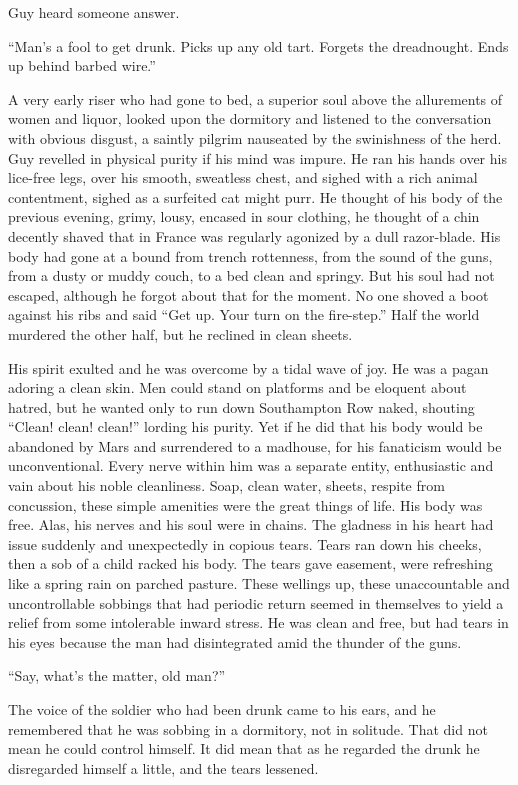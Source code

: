 Guy heard someone answer.

``Man's a fool to get drunk. Picks up any old tart. Forgets the dreadnought. Ends up behind barbed wire.''

A very early riser who had gone to bed, a superior soul above the allurements of women and liquor, looked upon the dormitory and listened to the conversation with obvious disgust, a saintly pilgrim nauseated by the swinishness of the herd. Guy revelled in physical purity if his mind was impure. He ran his hands over his lice-free legs, over his smooth,  sweatless chest, and sighed with a rich animal contentment, sighed as a surfeited cat might purr. He thought of his body of the previous evening, grimy, lousy, encased in sour clothing, he thought of a chin decently shaved that in France was regularly agonized by a dull razor-blade. His body had gone at a bound from trench rottenness, from the sound of the guns, from a dusty or muddy couch, to a bed clean and springy. But his soul had not escaped, although he forgot about that for the moment. No one shoved a boot against his ribs and said ``Get up. Your turn on the fire-step.'' Half the world murdered the other half, but he reclined in clean sheets.

His spirit exulted and he was overcome by a tidal wave of joy. He was a pagan adoring a clean skin. Men could stand on platforms and be eloquent about hatred, but he wanted only to run down Southampton Row naked, shouting ``Clean! clean! clean!'' lording his purity. Yet if he did that his body would be abandoned by Mars and surrendered to a madhouse, for his fanaticism would be unconventional. Every nerve within him was a separate entity, enthusiastic and vain about his noble cleanliness. Soap, clean water, sheets, respite from concussion, these simple amenities were the great things of life. His body was free. Alas, his nerves and his soul were in chains. The gladness in his heart had issue suddenly and unexpectedly in copious tears. Tears ran down his cheeks, then a sob of a child racked his body. The tears gave easement, were refreshing like a spring rain on parched pasture. These wellings up, these unaccountable and uncontrollable sobbings that had periodic return seemed in themselves to yield a relief from some intolerable inward stress. He was clean and free, but had tears in his eyes because the man had disintegrated amid the thunder of the guns.

``Say, what's the matter, old man?''

The voice of the soldier who had been drunk came to his ears, and he remembered that he was sobbing in a dormitory, not in solitude. That did not mean he could control himself. It did mean that as he regarded the drunk he disregarded himself a little, and the tears lessened.

